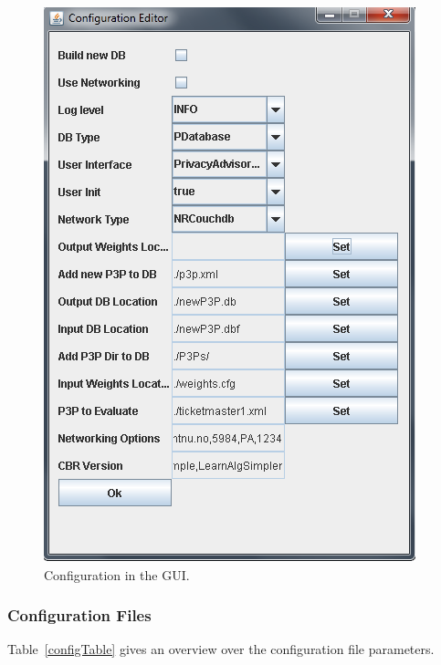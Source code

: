 \begin{centering}
  \begin{figure}
    \includegraphics{Documentation/gui_config.png}
    \caption{Configuration in the GUI.}
    \label{guiConfig}
  \end{figure}
\end{centering}

\subsubsection{Configuration Files}

Table~\ref{configTable} gives an overview over the configuration file parameters.

